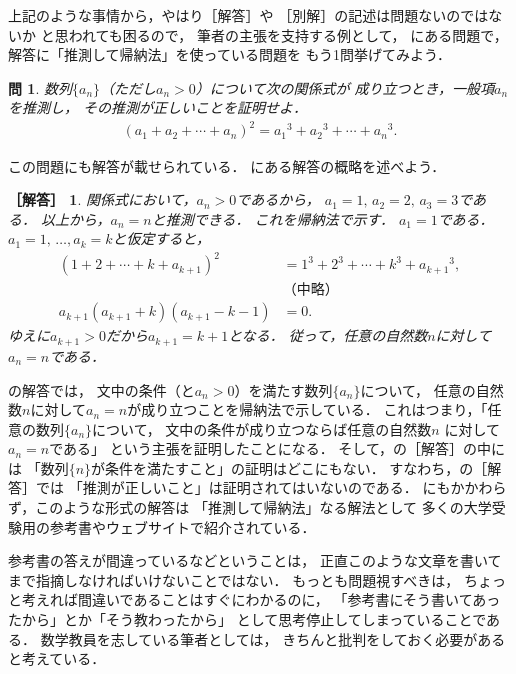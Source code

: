 \documentclass[11pt,a4paper]{ltjsarticle} %
\theoremstyle{mystyle} %
\newtheorem{que}{問} %
\newtheorem*{ans}{［解答］} %
\begin{document}
上記のような事情から，やはり［解答］や
［別解］の記述は問題ないのではないか
と思われても困るので，
筆者の主張を支持する例として，
\cite{chert}にある問題で，解答に「推測して帰納法」を使っている問題を
もう1問挙げてみよう．
\begin{que} \label{que:suisokuchert2}
  数列$\{ a_n \}$（ただし$a_n > 0$）について次の関係式が
  成り立つとき，一般項$a_n$を推測し，
  その推測が正しいことを証明せよ．
  \begin{align}
    ( a_1 + a_2 + \cdots + a_n )^2 =
    {a_1} ^3 + {a_2} ^3 + \cdots + {a_n } ^3 .
    \label{eq:suisoku2}
  \end{align}
\end{que}

この問題にも解答が載せられている．
\cite{chert}にある解答の概略を述べよう．

\begin{ans}
  関係式において，$a_n > 0$であるから，
  $a_1=1, \, a_2=2, \, a_3=3$である．
  以上から，$a_n = n$と推測できる．
  これを帰納法で示す．
  $a_1 = 1$である．
  $a_1=1, \, \ldots, a_k = k$と仮定すると，
  \begin{align*}
    (1+2+ \cdots + k + a_{k+1})^2 & = 1^3 + 2^3 + \cdots + k^3 + {a_{k+1}} ^3, \\
                                  & \text{（中略）} \\
    a_{k+1}(a_{k+1} + k) (a_{k+1} - k - 1) & = 0.
  \end{align*}
    ゆえに$a_{k+1} > 0$だから$a_{k+1} = k+1$となる．
    従って，任意の自然数$n$に対して$a_n = n$である．
\end{ans}



の解答では，
文中の条件（と$a_n > 0$）を満たす数列$\{ a_n \}$について，
任意の自然数$n$に対して$a_n = n$が成り立つことを帰納法で示している．
これはつまり，「任意の数列$\{ a_n \}$について，
文中の条件が成り立つならば任意の自然数$n$
に対して$a_n = n$である」
という主張を証明したことになる．
そして，の［解答］の中には
「数列$\{ n \}$が条件を満たすこと」の証明はどこにもない．
すなわち，の［解答］では
「推測が正しいこと」は証明されてはいないのである．
にもかかわらず，このような形式の解答は
「推測して帰納法」なる解法として
多くの大学受験用の参考書やウェブサイトで紹介されている．

参考書の答えが間違っているなどということは，
正直このような文章を書いてまで指摘しなければいけないことではない．
もっとも問題視すべきは，
ちょっと考えれば間違いであることはすぐにわかるのに，
「参考書にそう書いてあったから」とか「そう教わったから」
として思考停止してしまっていることである．
数学教員を志している筆者としては，
きちんと批判をしておく必要があると考えている．
\end{document}
